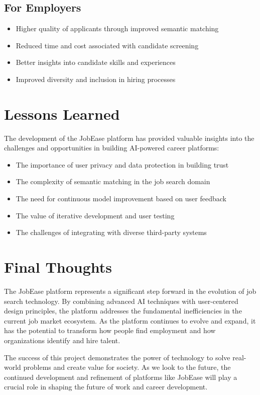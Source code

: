 \documentclass[12pt,a4paper]{report}
\begin{document}
\subsection{For Employers}
\begin{itemize}[leftmargin=2em]
  \item Higher quality of applicants through improved semantic matching
  \item Reduced time and cost associated with candidate screening
  \item Better insights into candidate skills and experiences
  \item Improved diversity and inclusion in hiring processes
\end{itemize}

\section{Lessons Learned}
The development of the JobEase platform has provided valuable insights into the challenges and opportunities in building AI-powered career platforms:

\begin{itemize}[leftmargin=2em]
  \item The importance of user privacy and data protection in building trust
  \item The complexity of semantic matching in the job search domain
  \item The need for continuous model improvement based on user feedback
  \item The value of iterative development and user testing
  \item The challenges of integrating with diverse third-party systems
\end{itemize}

\section{Final Thoughts}
The JobEase platform represents a significant step forward in the evolution of job search technology. By combining advanced AI techniques with user-centered design principles, the platform addresses the fundamental inefficiencies in the current job market ecosystem. As the platform continues to evolve and expand, it has the potential to transform how people find employment and how organizations identify and hire talent.

The success of this project demonstrates the power of technology to solve real-world problems and create value for society. As we look to the future, the continued development and refinement of platforms like JobEase will play a crucial role in shaping the future of work and career development.
\end{document}
